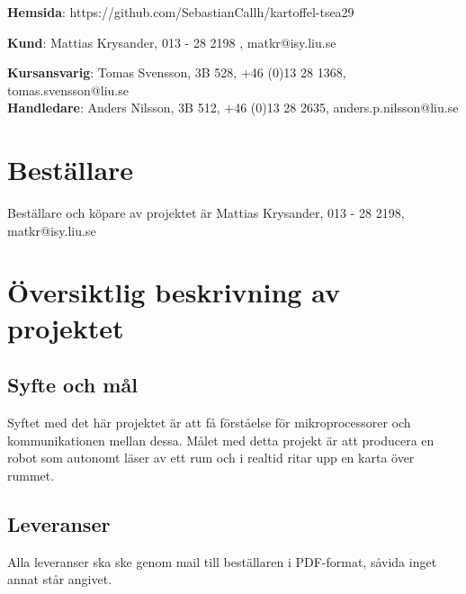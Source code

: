 \documentclass{article}
\begin{document}
\begin{center}
\textbf{Hemsida}: https://github.com/SebastianCallh/kartoffel-tsea29
\end{center}

\begin{center}
\textbf{Kund}: Mattias Krysander, 013 - 28 2198 , matkr@isy.liu.se
\end{center}

\begin{center}
\textbf{Kursansvarig}: Tomas Svensson, 3B 528, +46 (0)13 28 1368, tomas.svensson@liu.se \\
\textbf{Handledare}: Anders Nilsson, 3B 512, +46 (0)13 28 2635, anders.p.nilsson@liu.se
\end{center}
\vspace*{\fill}
\clearpage



\renewcommand*\contentsname{Innehållsförteckning}
\tableofcontents
\clearpage

\section{Beställare}
Beställare och köpare av projektet är Mattias Krysander, 013 - 28 2198, matkr@isy.liu.se

\section{Översiktlig beskrivning av projektet}

\subsection{Syfte och mål}
Syftet med det här projektet är att få förståelse för mikroprocessorer och kommunikationen mellan
dessa. Målet med detta projekt är att producera en robot som autonomt läser av ett rum och i realtid  ritar upp en karta över rummet.

\subsection{Leveranser}
Alla leveranser ska ske genom mail till beställaren i PDF-format, såvida inget annat står angivet.
\end{document}
